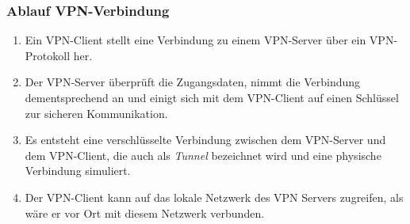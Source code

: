 \subsubsection{Ablauf VPN-Verbindung}
\begin{enumerate}
    \item Ein VPN-Client stellt eine Verbindung zu einem VPN-Server über ein VPN-Protokoll her.
    \item Der VPN-Server überprüft die Zugangsdaten, nimmt die Verbindung dementsprechend an und einigt sich mit dem VPN-Client auf einen Schlüssel zur sicheren Kommunikation.
    \item Es entsteht eine verschlüsselte Verbindung zwischen dem VPN-Server und dem VPN-Client, die auch als \textit{Tunnel} bezeichnet wird und eine physische Verbindung simuliert.
    \item Der VPN-Client kann auf das lokale Netzwerk des VPN Servers zugreifen, als wäre er vor Ort mit diesem Netzwerk verbunden.
\end{enumerate}
\newpage
\noindent
